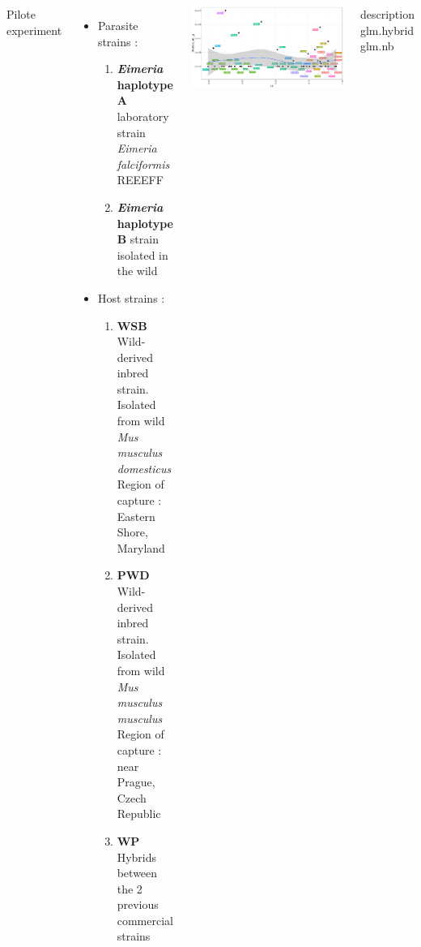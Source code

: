 \documentclass[30pt, a0paper, portrait, margin=0mm, innermargin=15mm,
               blockverticalspace=15mm, colspace=15mm, subcolspace=8mm]{tikzposter}
\begin{document}
\begin{columns}

      {Pilote experiment
      \begin{itemize}
      
      \item Parasite strains :
      
      \begin{enumerate}
      \item \textbf{\textit{Eimeria} haplotype A} laboratory strain \textit{Eimeria falciformis} REEEFF
      \item \textbf{\textit{Eimeria} haplotype B} strain isolated in the wild 
      \end{enumerate}
      
      \item Host strains :
      
      \begin{enumerate}
      \item \textbf{WSB} Wild-derived inbred strain. Isolated from wild \textit{Mus musculus domesticus}\\ Region of capture : Eastern Shore, Maryland
      \item \textbf{PWD} Wild-derived inbred strain. Isolated from wild \textit{Mus musculus musculus}\\ Region of capture : near Prague, Czech Republic
      \item \textbf{WP} Hybrids between the 2 previous commercial strains
      \end{enumerate}
      
      \end{itemize}
}




{
\begin{center}
	\includegraphics[scale=0.8]{firstphuong.png}
\end{center}
description\\
glm.hybrid\\ 
glm.nb

}
\end{columns}
\end{document}
